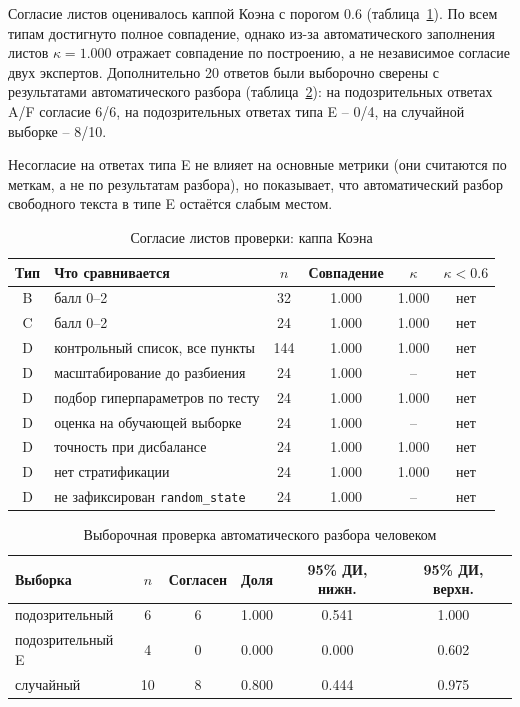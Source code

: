 \documentclass{bmstu}
\begin{document}
Согласие листов оценивалось каппой Коэна с порогом 0.6 (таблица~\ref{tab:kappa}). По всем типам достигнуто полное совпадение, однако из-за автоматического заполнения листов $\kappa=1.000$ отражает совпадение по построению, а не независимое согласие двух экспертов. Дополнительно 20 ответов были выборочно сверены с результатами автоматического разбора (таблица~\ref{tab:parser}): на подозрительных ответах A/F согласие 6/6, на подозрительных ответах типа E -- 0/4, на случайной выборке -- 8/10.

Несогласие на ответах типа E не влияет на основные метрики (они считаются по меткам, а не по результатам разбора), но показывает, что автоматический разбор свободного текста в типе E остаётся слабым местом.

\begin{table}[htbp]
\centering
\caption{Согласие листов проверки: каппа Коэна}
\label{tab:kappa}
\begin{tabular}{|c|l|c|c|c|c|}
\hline
Тип & Что сравнивается & $n$ & Совпадение & $\kappa$ & $\kappa<0.6$ \\
\hline
B & балл 0--2 & 32 & 1.000 & 1.000 & нет \\
C & балл 0--2 & 24 & 1.000 & 1.000 & нет \\
D & контрольный список, все пункты & 144 & 1.000 & 1.000 & нет \\
D & масштабирование до разбиения & 24 & 1.000 & -- & нет \\
D & подбор гиперпараметров по тесту & 24 & 1.000 & 1.000 & нет \\
D & оценка на обучающей выборке & 24 & 1.000 & -- & нет \\
D & точность при дисбалансе & 24 & 1.000 & 1.000 & нет \\
D & нет стратификации & 24 & 1.000 & 1.000 & нет \\
D & не зафиксирован \texttt{random\_state} & 24 & 1.000 & -- & нет \\
\hline
\end{tabular}
\vspace{-10pt}
\end{table}


\begin{table}[H]
\centering
\caption{Выборочная проверка автоматического разбора человеком}
\label{tab:parser}
\begin{tabular}{|l|c|c|c|c|c|}
\hline
Выборка & $n$ & Согласен & Доля & 95\% ДИ, нижн. & 95\% ДИ, верхн. \\
\hline
подозрительный & 6 & 6 & 1.000 & 0.541 & 1.000 \\
подозрительный E & 4 & 0 & 0.000 & 0.000 & 0.602 \\
случайный & 10 & 8 & 0.800 & 0.444 & 0.975 \\
\hline
\end{tabular}
\vspace{-10pt}
\end{table}
\end{document}

